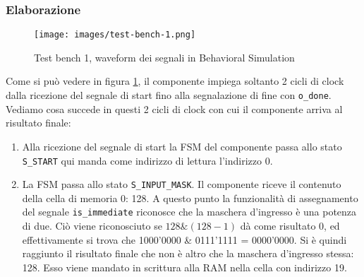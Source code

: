 \documentclass{article}
\begin{document}
\subsubsection{Elaborazione}
\begin{figure}[H]
    \centering
    \caption{Test bench 1, waveform dei segnali in Behavioral Simulation}
    \texttt{[image: images/test-bench-1.png]}
    \label{fig:test-bench-1}
\end{figure}
Come si può vedere in figura \ref{fig:test-bench-1}, il componente impiega soltanto 2 cicli di clock dalla ricezione del segnale di start fino alla segnalazione di fine con \verb^o_done^.\\
Vediamo cosa succede in questi 2 cicli di clock con cui il componente arriva al risultato finale:
\renewcommand{\labelenumi}{\Roman{enumi}}
\begin{enumerate}
    \item Alla ricezione del segnale di start la FSM del componente passa allo stato \verb^S_START^ qui manda come indirizzo di lettura l'indirizzo 0.
    \item La FSM passa allo stato \verb^S_INPUT_MASK^. Il componente riceve il contenuto della cella di memoria 0: 128. A questo punto la funzionalità di assegnamento del segnale \verb^is_immediate^ riconosce che la maschera d'ingresso è una potenza di due. Ciò viene riconosciuto se \(128\&(128-1)\) dà come risultato 0, ed effettivamente si trova che 1000'0000 \& 0111'1111 = 0000'0000. Si è quindi raggiunto il risultato finale che non è altro che la maschera d'ingresso stessa: 128.  Esso viene mandato in scrittura alla RAM nella cella con indirizzo 19.
\end{enumerate}
\end{document}
